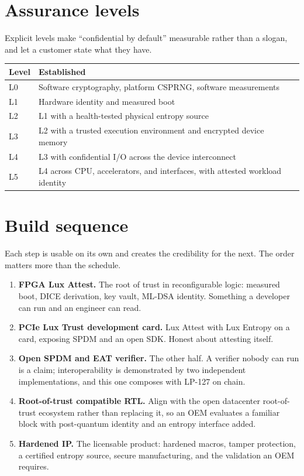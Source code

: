 \documentclass[11pt,a4paper]{article}
\begin{document}
\section{Assurance levels}

Explicit levels make ``confidential by default'' measurable rather than a
slogan, and let a customer state what they have.

\begin{center}
\begin{tabular}{@{}ll@{}}
\toprule
Level & Established \\
\midrule
L0 & Software cryptography, platform CSPRNG, software measurements \\
L1 & Hardware identity and measured boot \\
L2 & L1 with a health-tested physical entropy source \\
L3 & L2 with a trusted execution environment and encrypted device memory \\
L4 & L3 with confidential I/O across the device interconnect \\
L5 & L4 across CPU, accelerators, and interfaces, with attested workload identity \\
\bottomrule
\end{tabular}
\end{center}

\section{Build sequence}

Each step is usable on its own and creates the credibility for the next. The
order matters more than the schedule.

\begin{enumerate}
\item \textbf{FPGA Lux Attest.} The root of trust in reconfigurable logic:
measured boot, DICE derivation, key vault, ML-DSA identity. Something a
developer can run and an engineer can read.
\item \textbf{PCIe Lux Trust development card.} Lux Attest with Lux Entropy on
a card, exposing SPDM and an open SDK. Honest about attesting itself.
\item \textbf{Open SPDM and EAT verifier.} The other half. A verifier nobody
can run is a claim; interoperability is demonstrated by two independent
implementations, and this one composes with LP-127 on chain.
\item \textbf{Root-of-trust compatible RTL.} Align with the open datacenter
root-of-trust ecosystem rather than replacing it, so an OEM evaluates a
familiar block with post-quantum identity and an entropy interface added.
\item \textbf{Hardened IP.} The licensable product: hardened macros, tamper
protection, a certified entropy source, secure manufacturing, and the
validation an OEM requires.
\end{enumerate}
\end{document}
